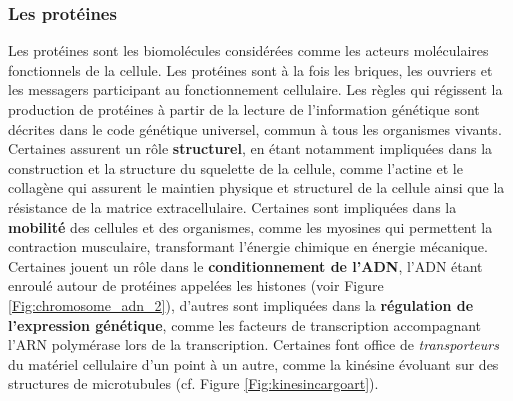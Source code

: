 
\subsubsection{Les protéines}


Les protéines sont les biomolécules considérées comme les acteurs moléculaires fonctionnels de la cellule. Les protéines sont à la fois les briques, les ouvriers et les messagers participant au fonctionnement cellulaire. Les règles qui régissent la production de protéines à partir de la lecture de l'information génétique sont décrites dans le code génétique universel, commun à tous les organismes vivants. Certaines assurent un rôle \textbf{structurel}, en étant notamment impliquées dans la construction et la structure du squelette de la cellule, comme l'actine et le collagène qui assurent le maintien physique et structurel de la cellule ainsi que la résistance de la matrice extracellulaire. Certaines sont impliquées dans la \textbf{mobilité} des cellules et des organismes, comme les myosines qui permettent la contraction musculaire, transformant l'énergie chimique en énergie mécanique. Certaines jouent un rôle dans le \textbf{conditionnement de l'ADN}, l'ADN étant enroulé autour de protéines appelées les histones (voir Figure \ref{Fig:chromosome_adn_2}), d'autres sont impliquées dans la \textbf{régulation de l'expression génétique}, comme les facteurs de transcription accompagnant l'ARN polymérase lors de la transcription. Certaines font office de \textit{transporteurs} du matériel cellulaire d'un point à un autre, comme la kinésine évoluant sur des structures de microtubules (cf. Figure \ref{Fig:kinesincargoart}).

